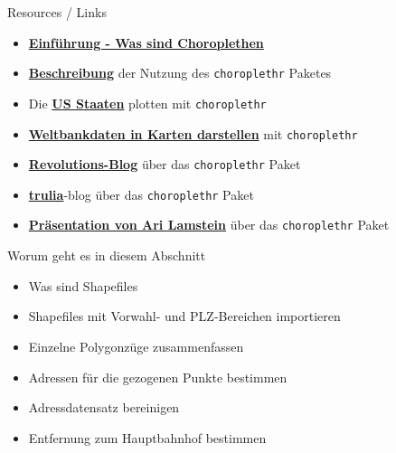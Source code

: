 \documentclass[ignorenonframetext,]{beamer}
\providecommand{\tightlist}{%
  \setlength{\itemsep}{0pt}\setlength{\parskip}{0pt}}
\begin{document}
\begin{frame}[fragile]{Resources / Links}

\begin{itemize}
\item
  \href{https://cran.r-project.org/web/packages/choroplethr/vignettes/a-introduction.html}{\textbf{Einführung
  - Was sind Choroplethen}}
\item
  \href{http://radar.oreilly.com/2014/01/new-choropleth-package-in-r.html}{\textbf{Beschreibung}}
  der Nutzung des \texttt{choroplethr} Paketes
\item
  Die
  \href{https://cran.r-project.org/web/packages/choroplethr/vignettes/b-state-choropleth.html}{\textbf{US
  Staaten}} plotten mit \texttt{choroplethr}
\item
  \href{https://cran.r-project.org/web/packages/choroplethr/vignettes/f-world-bank-data.html}{\textbf{Weltbankdaten
  in Karten darstellen}} mit \texttt{choroplethr}
\item
  \href{http://blog.revolutionanalytics.com/2014/01/easy-data-maps-with-r-the-choroplethr-package-.html}{\textbf{Revolutions-Blog}}
  über das \texttt{choroplethr} Paket
\item
  \href{http://www.trulia.com/tech/2014/01/15/the-choroplethr-package-for-r/}{\textbf{trulia}}-blog
  über das \texttt{choroplethr} Paket
\item
  \href{http://www.r-bloggers.com/slides-for-my-upcoming-talk-mapping-census-data-in-r/}{\textbf{Präsentation
  von Ari Lamstein}} über das \texttt{choroplethr} Paket
\end{itemize}

\end{frame}

\begin{frame}{Worum geht es in diesem Abschnitt}

\begin{itemize}
\tightlist
\item
  Was sind Shapefiles
\item
  Shapefiles mit Vorwahl- und PLZ-Bereichen importieren
\item
  Einzelne Polygonzüge zusammenfassen
\item
  Adressen für die gezogenen Punkte bestimmen
\item
  Adressdatensatz bereinigen
\item
  Entfernung zum Hauptbahnhof bestimmen
\end{itemize}

\end{frame}
\end{document}
